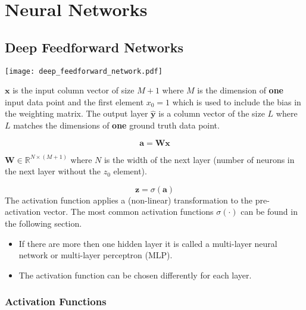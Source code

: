 \section{Neural Networks}

\subsection{Deep Feedforward Networks}

\begin{center}
    \texttt{[image: deep\_feedforward\_network.pdf]}
\end{center}

$\mathbf{x}$ is the input column vector of size $M+1$ where $M$ is the dimension of \textbf{one} input data point and the first element $x_0 = 1$ which is used to include the bias in the weighting matrix.
\newpar{}
The output layer $\hat{\mathbf{y}}$ is a column vector of the size $L$ where $L$ matches the dimensions of \textbf{one} ground truth data point.

\newpar{}
\begin{equation*}
    \mathbf{a} = \mathbf{W} \mathbf{x}
\end{equation*}

$\mathbf{W} \in \mathbb{R}^{N\times (M+1)}$ where $N$ is the width of the next layer (number of neurons in the next layer without the $z_0$ element).

\newpar{}
\begin{equation*}
    \mathbf{z} = \sigma(\mathbf{a})
\end{equation*}
The activation function applies a (non-linear) transformation to the pre-activation vector. The most common activation functions $\sigma(\cdot)$ can be found in the following section.

\newpar{}
\begin{itemize}
    \item If there are more then one hidden layer it is called a multi-layer neural network or multi-layer perceptron (MLP).
    \item The activation function can be chosen differently for each layer.
\end{itemize}


\subsubsection{Activation Functions}

